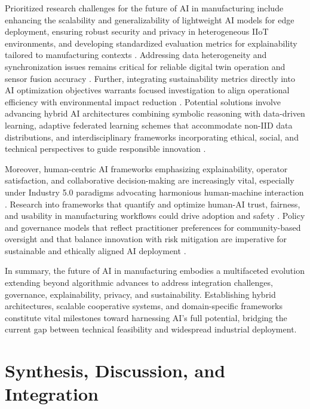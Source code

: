 \documentclass[sigconf]{acmart}
\begin{document}
Prioritized research challenges for the future of AI in manufacturing include enhancing the scalability and generalizability of lightweight AI models for edge deployment, ensuring robust security and privacy in heterogeneous IIoT environments, and developing standardized evaluation metrics for explainability tailored to manufacturing contexts \cite{ref30,ref38}. Addressing data heterogeneity and synchronization issues remains critical for reliable digital twin operation and sensor fusion accuracy \cite{ref26,ref39}. Further, integrating sustainability metrics directly into AI optimization objectives warrants focused investigation to align operational efficiency with environmental impact reduction \cite{ref41,ref44}. Potential solutions involve advancing hybrid AI architectures combining symbolic reasoning with data-driven learning, adaptive federated learning schemes that accommodate non-IID data distributions, and interdisciplinary frameworks incorporating ethical, social, and technical perspectives to guide responsible innovation \cite{ref6,ref25}.

Moreover, human-centric AI frameworks emphasizing explainability, operator satisfaction, and collaborative decision-making are increasingly vital, especially under Industry 5.0 paradigms advocating harmonious human-machine interaction \cite{ref6,ref35}. Research into frameworks that quantify and optimize human-AI trust, fairness, and usability in manufacturing workflows could drive adoption and safety \cite{ref44}. Policy and governance models that reflect practitioner preferences for community-based oversight and that balance innovation with risk mitigation are imperative for sustainable and ethically aligned AI deployment \cite{ref25}.

In summary, the future of AI in manufacturing embodies a multifaceted evolution extending beyond algorithmic advances to address integration challenges, governance, explainability, privacy, and sustainability. Establishing hybrid architectures, scalable cooperative systems, and domain-specific frameworks constitute vital milestones toward harnessing AI’s full potential, bridging the current gap between technical feasibility and widespread industrial deployment.

\newpage  
  


\section{Synthesis, Discussion, and Integration}
\end{document}
